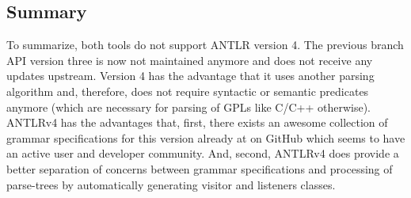\subsection{Summary}
To summarize, both tools do not support ANTLR version 4.
The previous branch API version three is now not maintained anymore and
does not receive any updates upstream. 
Version 4 has the advantage that it uses another parsing algorithm and,
therefore, does not require syntactic or semantic predicates anymore
\cite{Parr2013definitive}\cite{parr1994adding}\cite{Parr2011ll}
(which are necessary for parsing of GPLs like C/C++ otherwise).
ANTLRv4 has the advantages that, first, there exists an awesome 
collection of grammar specifications for this version already at 
\cite{grammars_v4} on GitHub which seems to have
an active user and developer community. 
And, second, ANTLRv4 does provide a better separation of concerns
between grammar specifications and processing of parse-trees
by automatically generating visitor and listeners classes.

